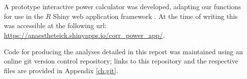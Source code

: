 \\
\\
A prototype interactive power calculator was developed, adapting our functions for use in the $R$ Shiny web application framework \cite{r_shiny}.  At the time of writing this was accessible at the following url:  \href{https://anaestheteick.shinyapps.io/corr_power_app/}{https://anaestheteick.shinyapps.io/corr\_power\_app/}.

Code for producing the analyses detailed in this report was maintained using an online git version control repository; links to this repository and the respective files are provided in Appendix \ref{ch:git}.